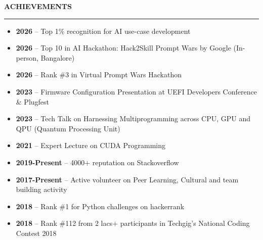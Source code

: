 \documentclass{resume} %
\renewenvironment{rSection}[1]{ %
  \sectionskip
  \textcolor{primaryColor}{\MakeUppercase{\bf #1}} %
  \sectionlineskip
  {\color{primaryColor}\hrule} %
  \begin{list}{}{ %
    \setlength{\leftmargin}{1.5em} %
  }
  \item[]
}{
  \end{list}
}
\begin{document}
\begin{rSection}{Achievements}

\begin{itemize}
    \item \textbf{2026} -- Top 1\% recognition for AI use-case development
    \item \textbf{2026} -- Top 10 in AI Hackathon: Hack2Skill Prompt Wars by Google (In-person, Bangalore)
    \item \textbf{2026} -- Rank \#3 in Virtual Prompt Wars Hackathon
    \item \textbf{2023} -- Firmware Configuration Presentation at UEFI Developers Conference \& Plugfest
    \item \textbf{2023} -- Tech Talk on Harnessing Multiprogramming across CPU, GPU and QPU (Quantum Processing Unit)
    \item \textbf{2021} -- Expert Lecture on CUDA Programming
    \item \textbf{2019-Present} -- 4000+ reputation on Stackoverflow
    \item \textbf{2017-Present} -- Active volunteer on Peer Learning, Cultural and team building activity
    \item \textbf{2018} -- Rank \#1 for Python challenges on hackerrank
    \item \textbf{2018} -- Rank \#112 from 2 lacs+ participants in Techgig's National Coding Contest 2018
\end{itemize}

\end{rSection}
\end{document}
